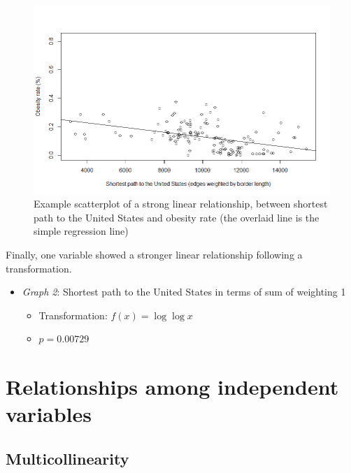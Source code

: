 \documentclass[oneside,12pt]{report}
\begin{document}
\begin{figure}
\centering
\label{fig:shortpath-obesity-scatter}
\includegraphics[width=\textwidth]{borderdegrees_wtd-obrate-scatter.png}
\caption[Scatterplot of a linear relationship with a graph-theoretic variable]{Example scatterplot of a strong linear relationship, between shortest path to the United States and obesity rate (the overlaid line is the simple regression line)}
\end{figure}

Finally, one variable showed a stronger linear relationship following a transformation.

\begin{itemize}
\item \textit{Graph 2}: Shortest path to the United States in terms of sum of weighting 1
	\begin{itemize}
	\item Transformation: \begin{math}f(x) = \log{\log{x}}\end{math}
	\item \begin{math}p=0.00729\end{math}
	\end{itemize}
\end{itemize}


\section*{Relationships among independent variables}
\subsection*{Multicollinearity}
\end{document}
